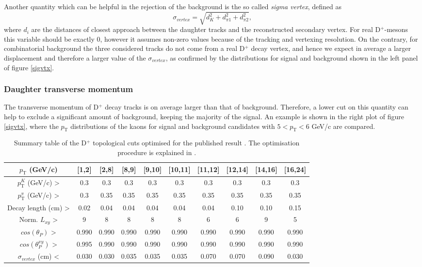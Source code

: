 \documentclass[b5paper,10pt,twoside,oldstyle,classica]{toptesi}
\newcommand{\pt}{p_\text{T}}
\begin{document}
Another quantity which can be helpful in the rejection of the background is the so called \textit{sigma vertex}, defined as 
\begin{equation}
 \sigma_{vertex} = \sqrt{d_K^2+d_{\pi 1}^2+d_{\pi 2}^2},
\end{equation}
where $d_i$ are the distances of closest approach between the daughter tracks and the reconstructed secondary vertex. For real D$^+$-mesons this variable should be exactly 0, however it assumes non-zero values because of the tracking and vertexing resolution. On the contrary, for combinatorial background the three considered tracks do not come from a real D$^+$ decay vertex, and hence we expect in average a larger displacement and therefore a larger value of the $\sigma_{vertex}$, as confirmed by the distributions for signal and background shown in the left panel of figure \ref{sigvtx}. 
\subsubsection{Daughter transverse momentum}
The transverse momentum of D$^+$ decay tracks is on average larger than that of background. Therefore, a lower cut on this quantity can help to exclude a significant amount of background, keeping the majority of the signal. An example is shown in the right plot of figure \ref{sigvtx}, where the $\pt$ distributions of the kaons for signal and background candidates with $5<\pt<6$ GeV/c are compared.
\begin{table}[b]
\centering 
\begin{center} %
\renewcommand\arraystretch{1.5} 
\fontsize{6}{8.5}\selectfont
\begin{tabular}{|c|c|c|c|c|c|c|c|c|c|}
\hline
$\pt$ (GeV/c) & [1,2] & [2,8] & [8,9] & [9,10] & [10,11] & [11,12] & [12,14] & [14,16] & [16,24]\\
\hline
$\pt^K$ (GeV/c) >& 0.3 & 0.3 & 0.3 & 0.3 & 0.3 & 0.3 & 0.3 & 0.3 & 0.3\\
$\pt^\pi$ (GeV/c) >& 0.3 & 0.35 & 0.35 & 0.35 & 0.35 & 0.35 & 0.35 & 0.35 & 0.35\\
Decay length (cm) >& 0.02 & 0.04 & 0.04 & 0.04 & 0.04 & 0.04 & 0.10 & 0.10 & 0.15\\
Norm. $L_{xy}$ >& 9 & 8 & 8 & 8 & 8 & 6 & 6 & 9 & 5\\
$cos(\theta_P)$ >& 0.990 & 0.990 & 0.990 & 0.990 & 0.990 & 0.990 & 0.990 & 0.990 & 0.990\\
$cos(\theta_P^{xy})$ >& 0.995 & 0.990 & 0.990 & 0.990 & 0.990 & 0.990 & 0.990 & 0.990 & 0.990\\
$\sigma_{vertex}$ (cm) <& 0.030 & 0.030 & 0.035 & 0.035 & 0.035 & 0.070 & 0.070 & 0.090 & 0.030\\
\hline
\end{tabular}
\caption{Summary table of the D$^+$ topological cuts optimised for the published result \cite{Abelev:2014hha}. The optimisation procedure is explained in \cite{Russo:2015xtz}.}
\label{paper_cuts}
\end{center} 
\end{table}
\end{document}
